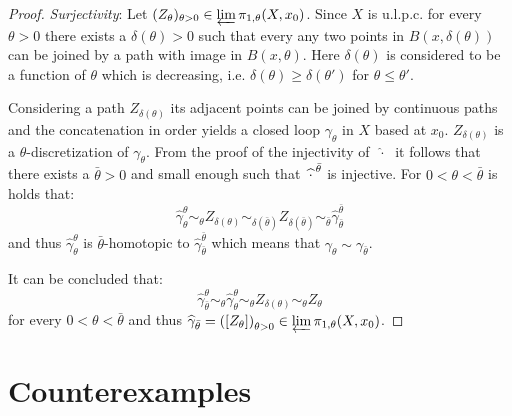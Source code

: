 \documentclass[a4paper, 11pt, twoside]{article}
\theoremstyle{break}
\theoremstyle{break}
\begin{document}
\begin{proof}
  \textit{Surjectivity}: Let $(Z_{\theta})_{\theta > 0} \in \varprojlim \pi_{1,\theta}(X, x_0)$. 
  Since $X$ is u.l.p.c. for every $\theta > 0$ there exists a $\delta(\theta) > 0$ such that every any two points in $B(x, \delta(\theta))$ can be joined by a path with image in $B(x, \theta)$.
  Here $\delta(\theta)$ is considered to be a function of $\theta$ which is decreasing, i.e. $\delta(\theta) \geq \delta(\theta')$ for $\theta \leq \theta'$.

  Considering a path $Z_{\delta(\theta)}$ its adjacent points can be joined by continuous paths and the concatenation in order yields a closed loop $\gamma_{\theta}$ in $X$ based at $x_0$.
  $Z_{\delta(\theta)}$ is a $\theta$-discretization of $\gamma_{\theta}$.
  From the proof of the injectivity of $\; \widehat{\cdot} \;$ it follows that there exists a $\bar{\theta} > 0$ and small enough such that 
  $\: \widehat{\cdot}^{\hspace*{2px}\bar{\theta}}$ is injective. For $0 < \theta < \bar{\theta}$ is holds that:
  \begin{equation*}
    \widehat{\gamma}_{\theta}^{\theta} \sim_{\theta} Z_{\delta(\theta)} \sim_{\delta(\bar{\theta})} Z_{\delta(\bar{\theta})} \sim_{\bar{\theta}} \widehat{\gamma}_{\bar{\theta}}^{{\bar{\theta}}}
  \end{equation*}
  and thus $\widehat{\gamma}_{\theta}^{\theta}$ is $\bar{\theta}$-homotopic to $\widehat{\gamma}_{\bar{\theta}}^{{\bar{\theta}}}$ which means that
  $\gamma_{\theta} \sim \gamma_{\bar{\theta}}$.

  It can be concluded that:
  \begin{equation*}
    \widehat{\gamma}_{\bar{\theta}}^{\theta} \sim_{\theta} \widehat{\gamma}_{\theta}^{\theta} \sim_{\theta} Z_{\delta(\theta)} \sim_{\theta} Z_{\theta}
  \end{equation*}
  for every $0 < \theta < \bar{\theta}$ and thus $\widehat{\gamma}_{\bar{\theta}} = \left(\left[Z_{\theta}\right]\right)_{\theta > 0} \in \varprojlim \pi_{1,\theta}(X, x_0)$.
\end{proof}

\section{Counterexamples}

\clearpage

\end{document}
